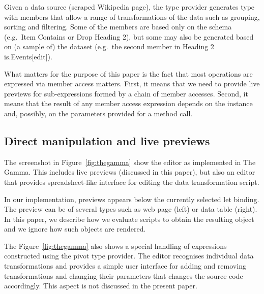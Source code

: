 \documentclass[sigplan,10pt]{acmart}\settopmatter{printfolios=true,printccs=false,printacmref=false}
\theoremstyle{plain}
\theoremstyle{definition}
\newcommand{\ident}[1]{\textnormal{\sffamily #1}}
\begin{document}
Given a data source (scraped Wikipedia page), the type provider generates type with members that allow
a range of transformations of the data such as grouping, sorting and filtering. Some of the members
are based only on the schema (e.g.~\ident{\textquotesingle Item Contains\textquotesingle} or 
\ident{\textquotesingle Drop Heading 2\textquotesingle}), but some may also be generated based
on (a sample of) the dataset (e.g.~the second member in \ident{\textquotesingle Heading 2 
is\textquotesingle.\textquotesingle Events[edit]\textquotesingle}). 

What matters for the purpose of this paper is 
the fact that most operations are expressed via member access matters. First, it means 
that we need to provide live previews for sub-expressions formed by a chain of member accesses.
Second, it means that the result of any member access expression depends on the instance and,
possibly, on the parameters provided for a method call.

\subsection{Direct manipulation and live previews}
The screenshot in Figure~\ref{fig:thegamma} show the editor as implemented in The Gamma. This
includes live previews (discussed in this paper), but also an editor that provides spreadsheet-like
interface for editing the data transformation script.

In our implementation, previews appears below the currently selected let binding.
The preview can be of several types such as web page (left) or data table (right). In this paper,
we describe how we evaluate scripts to obtain the resulting object and we ignore how such objects
are rendered.

The Figure~\ref{fig:thegamma} also shows a special handling of expressions constructed using the
pivot type provider. The editor recognises individual data transformations and provides a simple
user interface for adding and removing transformations and changing their parameters that changes
the source code accordingly. This aspect is not discussed in the present paper. 

\end{document}
